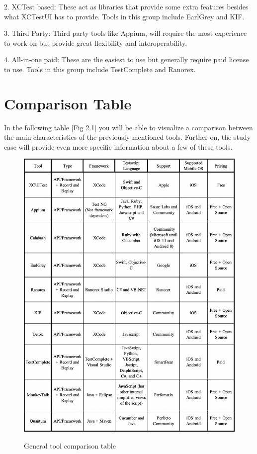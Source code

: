2. XCTest based: These act as libraries that provide some extra features besides what XCTestUI has to provide. Tools in this group include EarlGrey and KIF.

3. Third Party: Third party tools like Appium, will require the most experience to work on but provide great flexibility and interoperability.

4. All-in-one paid:  These are the easiest to use but generally require paid license to use. Tools in this group include TestComplete and Ranorex.

\section{Comparison Table}

In the following table [Fig 2.1] you will be able to visualize a comparison between the main characteristics of the previously mentioned tools. Further on, the study case will provide even more specific information about a few of these tools.

\begin{figure}[h!]
	\centering
	\includegraphics[width=12cm]{img/table1.png} \\[0mm]
	\vspace{0cm}
	\caption{General tool comparison table}
	\label{Toolcomparison}
\end{figure} 

